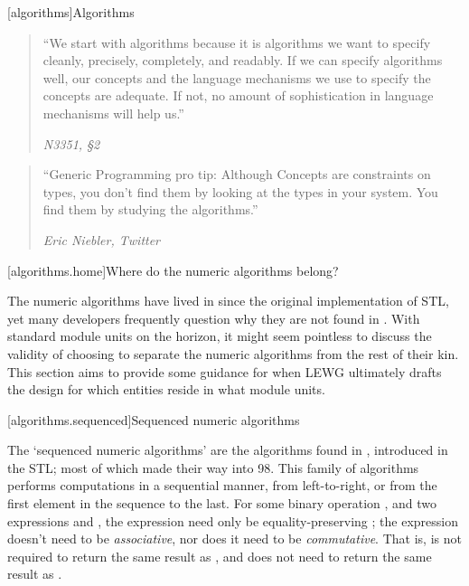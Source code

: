 [algorithms]{Algorithms}

\begin{quote}
``We start with algorithms because it is algorithms we want to specify cleanly, precisely,
completely, and readably. If we can specify algorithms well, our concepts and the language
mechanisms we use to specify the concepts are adequate. If not, no amount of sophistication in
language mechanisms will help us.''
\begin{flushright}
\textemdash \textit{N3351, \S{}2}
\end{flushright}
\end{quote}

\begin{quote}
``Generic Programming pro tip: Although Concepts are constraints on types, you don't find them by
looking at the types in your system. You find them by studying the algorithms.''
\begin{flushright}
\textemdash \textit{Eric Niebler, Twitter}
\end{flushright}
\end{quote}

[algorithms.home]{Where do the numeric algorithms belong?}

The numeric algorithms have lived in  since the original implementation of STL, yet
many developers frequently question why they are not found in . With standard
module units on the horizon, it might seem pointless to discuss the validity of choosing to separate
the numeric algorithms from the rest of their kin. This section aims to provide some guidance for
when LEWG ultimately drafts the design for which entities reside in what module units.


[algorithms.sequenced]{Sequenced numeric algorithms}

The `sequenced numeric algorithms' are the algorithms found in , introduced in the
STL; most of which made their way into \Cpp{}98. This family of algorithms performs computations in
a sequential manner, from left-to-right, or from the first element in the sequence to the last.
For some binary operation , and two expressions  and , the expression
 need only be equality-preserving ; the expression
 doesn't need to be \textit{associative}, nor does it need to be
\textit{commutative}. That is,  is not required to return the same result
as , and  does not need to return the same result as
.

